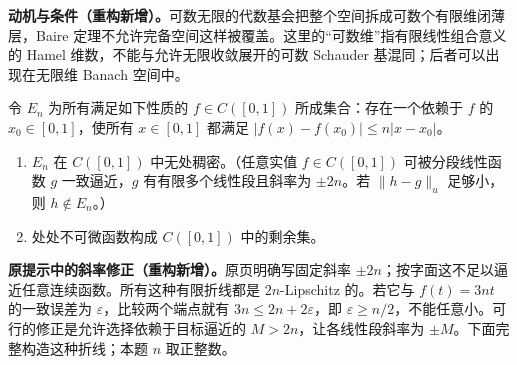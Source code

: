 \documentclass[../../main.tex]{subfiles}
\begin{document}
\begin{remark}
\textbf{动机与条件（重构新增）。}可数无限的代数基会把整个空间拆成可数个有限维闭薄层，Baire 定理不允许完备空间这样被覆盖。这里的“可数维”指有限线性组合意义的 Hamel 维数，不能与允许无限收敛展开的可数 Schauder 基混同；后者可以出现在无限维 Banach 空间中。
\end{remark}
\begin{exercise}\label{exercise:ch05-nowhere-differentiable}
\begin{definition*}[本题的差商有界集合]\label{definition:ch05-difference-quotient-sets}
令 $E_n$ 为所有满足如下性质的 $f\in C([0,1])$ 所成集合：存在一个依赖于 $f$ 的 $x_0\in[0,1]$，使所有 $x\in[0,1]$ 都满足 $|f(x)-f(x_0)|\le n|x-x_0|$。
\end{definition*}
\begin{enumerate}
\item\label{item:ch05-bounded-quotient-nowhere-dense} $E_n$ 在 $C([0,1])$ 中无处稠密。（任意实值 $f\in C([0,1])$ 可被分段线性函数 $g$ 一致逼近，$g$ 有有限多个线性段且斜率为 $\pm2n$。若 $\|h-g\|_u$ 足够小，则 $h\notin E_n$。）
\item\label{item:ch05-nowhere-differentiable-residual} 处处不可微函数构成 $C([0,1])$ 中的剩余集。
\end{enumerate}
\end{exercise}
\begin{remark}
\textbf{原提示中的斜率修正（重构新增）。}原页明确写固定斜率 $\pm2n$；按字面这不足以逼近任意连续函数。所有这种有限折线都是 $2n$-Lipschitz 的。若它与 $f(t)=3nt$ 的一致误差为 $\varepsilon$，比较两个端点就有 $3n\le2n+2\varepsilon$，即 $\varepsilon\ge n/2$，不能任意小。可行的修正是允许选择依赖于目标逼近的 $M>2n$，让各线性段斜率为 $\pm M$。下面完整构造这种折线；本题 $n$ 取正整数。
\end{remark}
\end{document}
